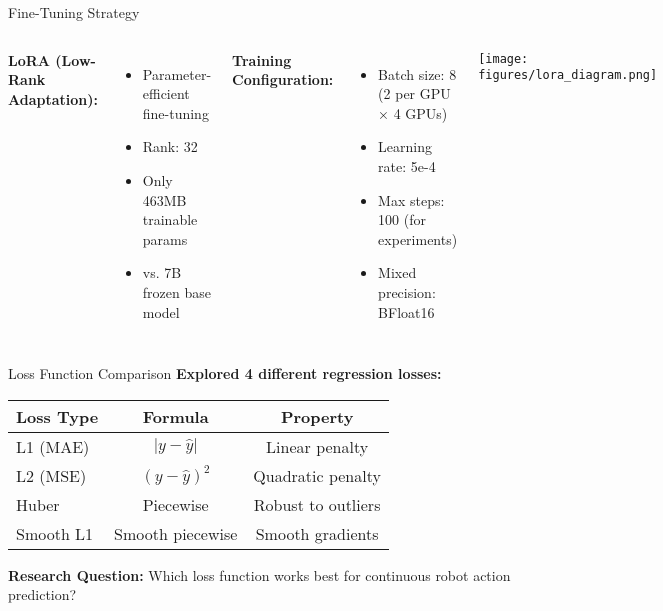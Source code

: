 \documentclass[aspectratio=169]{beamer}
\begin{document}
\begin{frame}{Fine-Tuning Strategy}
\begin{columns}
\textbf{LoRA (Low-Rank Adaptation):}
\begin{itemize}
    \item Parameter-efficient fine-tuning
    \item Rank: 32
    \item Only 463MB trainable params
    \item vs. 7B frozen base model
\end{itemize}

\vspace{0.3cm}
\textbf{Training Configuration:}
\begin{itemize}
    \item Batch size: 8 (2 per GPU × 4 GPUs)
    \item Learning rate: 5e-4
    \item Max steps: 100 (for experiments)
    \item Mixed precision: BFloat16
\end{itemize}

\begin{center}
\texttt{[image: figures/lora\_diagram.png]}
\end{center}
\end{columns}
\end{frame}

\begin{frame}{Loss Function Comparison}
\textbf{Explored 4 different regression losses:}

\vspace{0.3cm}
\begin{table}
\centering
\small
\begin{tabular}{lcc}
\toprule
\textbf{Loss Type} & \textbf{Formula} & \textbf{Property} \\
\midrule
L1 (MAE) & $|y - \hat{y}|$ & Linear penalty \\
L2 (MSE) & $(y - \hat{y})^2$ & Quadratic penalty \\
Huber & Piecewise & Robust to outliers \\
Smooth L1 & Smooth piecewise & Smooth gradients \\
\bottomrule
\end{tabular}
\end{table}

\vspace{0.3cm}
\textbf{Research Question:} Which loss function works best for continuous robot action prediction?
\end{frame}
\end{document}
